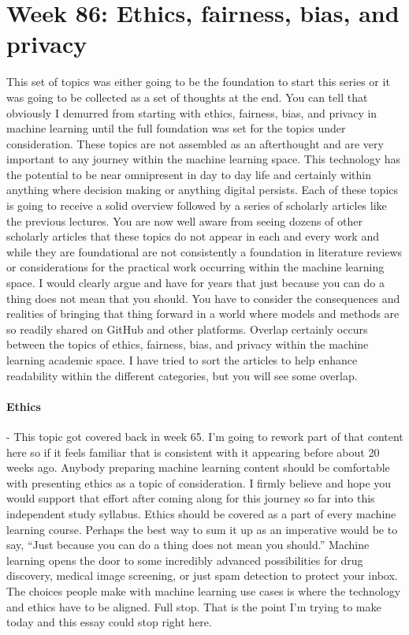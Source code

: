 \documentclass{article}
\begin{document}
\section{Week 86: Ethics, fairness, bias, and privacy}
This set of topics was either going to be the foundation to start this series or it was going to be collected as a set of thoughts at the end. You can tell that obviously I demurred from starting with ethics, fairness, bias, and privacy in machine learning until the full foundation was set for the topics under consideration. These topics are not assembled as an afterthought and are very important to any journey within the machine learning space. This technology has the potential to be near omnipresent in day to day life and certainly within anything where decision making or anything digital persists. Each of these topics is going to receive a solid overview followed by a series of scholarly articles like the previous lectures. You are now well aware from seeing dozens of other scholarly articles that these topics do not appear in each and every work and while they are foundational are not consistently a foundation in literature reviews or considerations for the practical work occurring within the machine learning space. I would clearly argue and have for years that just because you can do a thing does not mean that you should. You have to consider the consequences and realities of bringing that thing forward in a world where models and methods are so readily shared on GitHub and other platforms. 
Overlap certainly occurs between the topics of ethics, fairness, bias, and privacy within the machine learning academic space. I have tried to sort the articles to help enhance readability within the different categories, but you will see some overlap. 

\paragraph{Ethics} - This topic got covered back in week 65. I’m going to rework part of that content here so if it feels familiar that is consistent with it appearing before about 20 weeks ago. Anybody preparing machine learning content should be comfortable with presenting ethics as a topic of consideration. I firmly believe and hope you would support that effort after coming along for this journey so far into this independent study syllabus. Ethics should be covered as a part of every machine learning course. Perhaps the best way to sum it up as an imperative would be to say, “Just because you can do a thing does not mean you should.” Machine learning opens the door to some incredibly advanced possibilities for drug discovery, medical image screening, or just spam detection to protect your inbox. The choices people make with machine learning use cases is where the technology and ethics have to be aligned. Full stop. That is the point I’m trying to make today and this essay could stop right here.
\end{document}
